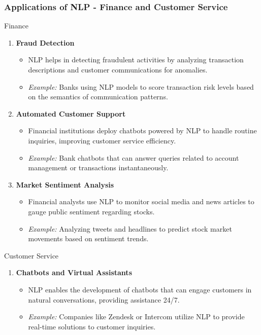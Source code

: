 \documentclass{beamer}
\begin{document}
\begin{frame}[fragile]
    \frametitle{Applications of NLP - Finance and Customer Service}
    \begin{block}{Finance}
        \begin{enumerate}
            \item \textbf{Fraud Detection}
            \begin{itemize}
                \item NLP helps in detecting fraudulent activities by analyzing transaction descriptions and customer communications for anomalies.
                \item \textit{Example:} Banks using NLP models to score transaction risk levels based on the semantics of communication patterns.
            \end{itemize}
            
            \item \textbf{Automated Customer Support}
            \begin{itemize}
                \item Financial institutions deploy chatbots powered by NLP to handle routine inquiries, improving customer service efficiency.
                \item \textit{Example:} Bank chatbots that can answer queries related to account management or transactions instantaneously.
            \end{itemize}
            
            \item \textbf{Market Sentiment Analysis}
            \begin{itemize}
                \item Financial analysts use NLP to monitor social media and news articles to gauge public sentiment regarding stocks.
                \item \textit{Example:} Analyzing tweets and headlines to predict stock market movements based on sentiment trends.
            \end{itemize}
        \end{enumerate}
    \end{block}
    
    \begin{block}{Customer Service}
        \begin{enumerate}
            \item \textbf{Chatbots and Virtual Assistants}
            \begin{itemize}
                \item NLP enables the development of chatbots that can engage customers in natural conversations, providing assistance 24/7.
                \item \textit{Example:} Companies like Zendesk or Intercom utilize NLP to provide real-time solutions to customer inquiries.
            \end{itemize}
            

\end{enumerate}
\end{block}
\end{frame}
\end{document}
